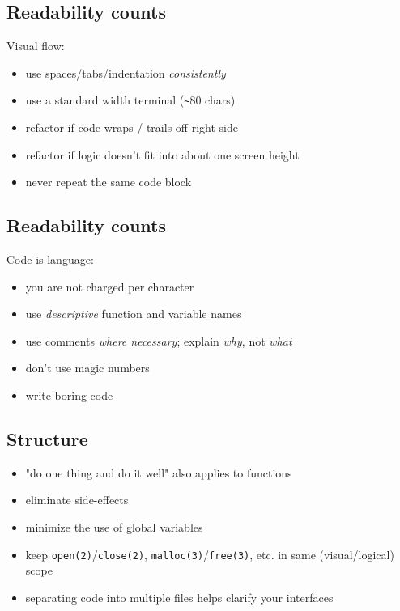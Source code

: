 \documentclass[xga]{xdvislides}
\begin{document}
\subsection{Readability counts}
Visual flow:
\begin{itemize}
	\item use spaces/tabs/indentation {\em consistently}
	\item use a standard width terminal (\verb+~+80 chars)
	\item refactor if code wraps / trails off right side
	\item refactor if logic doesn't fit into about one screen height
	\item never repeat the same code block
\end{itemize}

\subsection{Readability counts}
Code is language:
\begin{itemize}
	\item you are not charged per character
	\item use {\em descriptive} function and variable names
	\item use comments {\em where necessary}; explain {\em why}, not {\em what}
	\item don't use magic numbers
	\item write boring code
\end{itemize}

\subsection{Structure}
\begin{itemize}
	\item "do one thing and do it well" also applies to functions
	\item eliminate side-effects
	\item minimize the use of global variables
	\item keep \verb+open(2)+/\verb+close(2)+, \verb+malloc(3)+/\verb+free(3)+,
		etc. in same (visual/logical) scope
	\item separating code into multiple files helps clarify your interfaces
\end{itemize}
\end{document}
